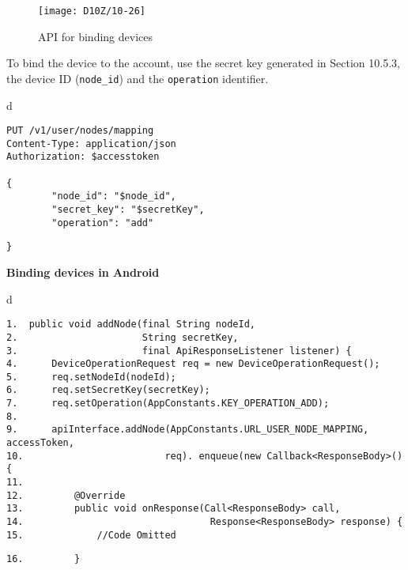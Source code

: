 \documentclass[a4paper,12pt]{book}
\begin{document}
\begin{figure}[ht]
    \centering
    \texttt{[image: D10Z/10-26]}
    \caption{API for binding devices}
\end{figure}

To bind the device to the account, use the secret key generated in Section 10.5.3, the device ID (\verb|node_id|) and the \verb|operation| identifier.

\begin{codebloc}
\begin{tabular}{d}
\vspace{2pt}
\begin{verbatim}
PUT /v1/user/nodes/mapping
Content-Type: application/json
Authorization: $accesstoken

{
        "node_id": "$node_id",
        "secret_key": "$secretKey",
        "operation": "add"
\end{verbatim}
\verb|}|
\end{tabular}
\end{codebloc}

\vspace{6pt}
\textbf{Binding devices in Android}


\begin{codebloc}
\begin{tabular}{d}
\vspace{2pt}
\begin{verbatim}
1.  public void addNode(final String nodeId,
2.                      String secretKey,
3.                      final ApiResponseListener listener) {
4.      DeviceOperationRequest req = new DeviceOperationRequest();
5.      req.setNodeId(nodeId);
6.      req.setSecretKey(secretKey);
7.      req.setOperation(AppConstants.KEY_OPERATION_ADD);
8.
9.      apiInterface.addNode(AppConstants.URL_USER_NODE_MAPPING, accessToken,
10.                         req). enqueue(new Callback<ResponseBody>() {
11.
12.         @Override
13.         public void onResponse(Call<ResponseBody> call,
14.                                 Response<ResponseBody> response) {
15.             //Code Omitted
\end{verbatim}
\verb|16.         }|
\end{tabular}
\end{codebloc}
\end{document}
